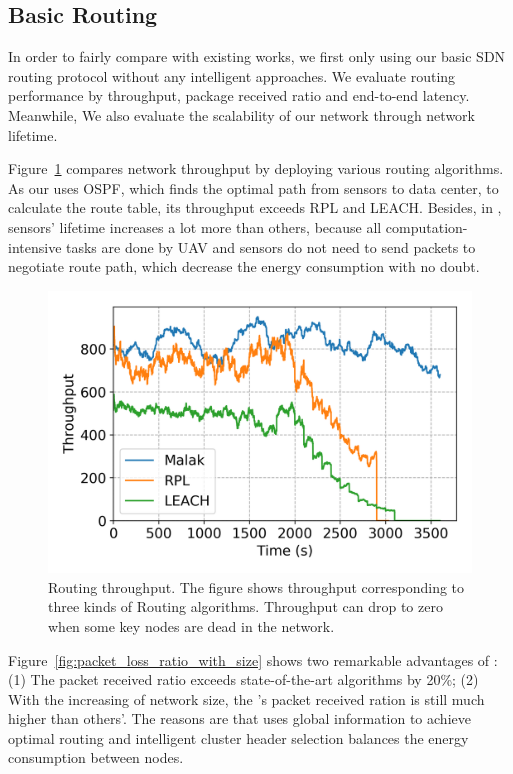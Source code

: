 \subsection{Basic Routing}

In order to fairly compare with existing works, we first only using our basic SDN 
routing protocol without any intelligent approaches. We evaluate routing performance by throughput, 
package received ratio and end-to-end latency. Meanwhile, We also evaluate the scalability of our network
through network lifetime.

Figure~\ref{fig:throughput} compares network throughput by deploying various
routing algorithms. As our {\sdn} uses OSPF, which finds the optimal path from
sensors to data center, to calculate the route table, its throughput exceeds RPL
and LEACH. Besides, in {\sdn}, sensors' lifetime increases a lot more than
others, because all computation-intensive tasks are done by UAV and sensors do
not need to send packets to negotiate route path, which decrease the energy
consumption with no doubt.

\begin{figure}[htbp]
	\centering
	\includegraphics[width=.95\columnwidth]{Figure/throughput}
	\vspace{-0.1in}
	\caption{Routing throughput.
		\textnormal{
			The figure shows throughput corresponding to three kinds of Routing
			algorithms. Throughput can drop to zero when some key nodes are dead
			in the network.
		}}
	\label{fig:throughput}
\end{figure}

Figure~\ref{fig:packet_loss_ratio_with_size} shows two remarkable advantages of
{\sdn}: (1) The packet received ratio exceeds state-of-the-art
algorithms\cite{winter2012rpl, kaur2016wsn} by 20\%; (2) With the increasing of
network size, the {\sdn}'s packet received ration is still much higher than
others'. The reasons are that {\sdn} uses global information to achieve optimal
routing and intelligent cluster header selection balances the energy consumption
between nodes.

